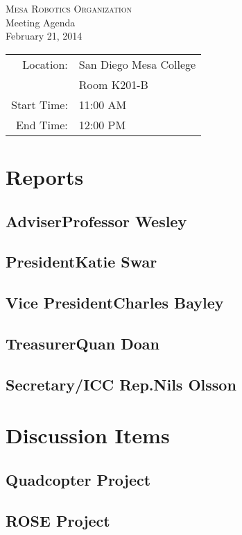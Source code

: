 \documentclass{article}
\def\date{February 21, 2014}
\def\room{Room K201-B}
\def\starttime{11:00 AM}
\def\endtime{12:00 PM}
\begin{document}
\begin{center}
{\LARGE\scshape Mesa Robotics Organization}\\[0.3cm]
{\Large Meeting Agenda}\\[0.3cm]
{\large \date}
\end{center}


\begin{tabular}{r l}
Location: & San Diego Mesa College \\
& \room \\
Start Time: & \starttime \\
End Time: & \endtime
\end{tabular}


\section{Reports}
\subsection{Adviser\dotfill Professor Wesley}
\subsection{President\dotfill Katie Swar}
\subsection{Vice President\dotfill Charles Bayley}
\subsection{Treasurer\dotfill Quan Doan}
\subsection{Secretary/ICC Rep.\dotfill Nils Olsson}


\section{Discussion Items}
\subsection{Quadcopter Project}
\subsection{ROSE Project}
\end{document}
